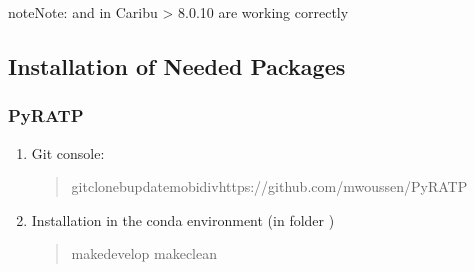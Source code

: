 \documentclass[letterpaper,10pt,english]{sphinxmanual}
\begin{document}
\begin{sphinxadmonition}{note}{Note:}
\sphinxAtStartPar
{} and  in Caribu \textgreater{} 8.0.10 are working correctly
\end{sphinxadmonition}


\subsection{Installation of Needed Packages}
\label{\detokenize{installation:installation-of-needed-packages}}

\subsubsection{PyRATP}
\label{\detokenize{installation:pyratp}}\begin{enumerate}
%
\item {} 
\sphinxAtStartPar
Git console:
\begin{quote}

\begin{sphinxVerbatim}[commandchars=\\\{\}]
gitclone\PYGZhy{}bupdate\PYGZus{}mobidivhttps://github.com/mwoussen/PyRATP
\end{sphinxVerbatim}
\end{quote}

\item {} 
\sphinxAtStartPar
Installation in the conda environment (in folder )
\begin{quote}

\begin{sphinxVerbatim}[commandchars=\\\{\}]
makedevelop
makeclean
\end{sphinxVerbatim}
\end{quote}

\end{enumerate}
\end{document}

